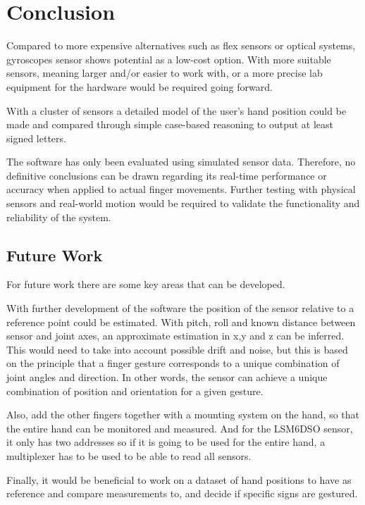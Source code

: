 \section{Conclusion}

Compared to more expensive alternatives such as flex sensors or optical systems, gyroscopes sensor shows potential as a low-cost option. With more suitable sensors, meaning larger and/or easier to work with, or a more precise lab equipment for the hardware would be required going forward.

With a cluster of sensors a detailed model of the user's hand position could be made and compared through simple case-based reasoning to output at least signed letters.

The software has only been evaluated using simulated sensor data. Therefore, no definitive conclusions can be drawn regarding its real-time performance or accuracy when applied to actual finger movements. Further testing with physical sensors and real-world motion would be required to validate the functionality and reliability of the system.

\subsection{Future Work}
For future work there are some key areas that can be developed.

With further development of the software the position of the sensor relative to a reference point could be estimated. With pitch, roll and known distance between sensor and joint axes, an approximate estimation in x,y and z can be inferred. This would need to take into account possible drift and noise, but this is based on the principle that a finger gesture corresponds to a unique combination of joint angles and direction. In other words, the sensor can achieve a unique combination of position and orientation for a given gesture.

Also, add the other fingers together with a mounting system on the hand, so that the entire hand can be monitored and measured. And for the LSM6DSO sensor, it only has two addresses so if it is going to be used for the entire hand, a multiplexer has to be used to be able to read all sensors.

Finally, it would be beneficial to work on a dataset of hand positions to have as reference and compare measurements to, and decide if specific signs are gestured. 